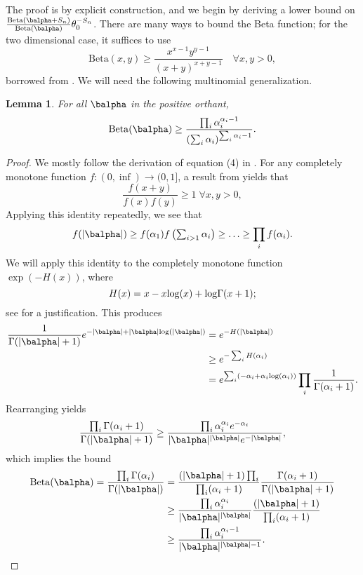 \documentclass[11pt]{article}
\def\log{{\rm log}}
\newcommand{\Beta}{\mathrm{Beta}}
\newtheorem{lemma}{Lemma}[section]
\begin{document}
The proof is by explicit construction, and we begin by deriving a lower bound on 
$
 \frac{\Beta(\balpha + S_n)} {\Beta(\balpha)} \theta_0 ^{-S_n}
$.
There are many ways to bound the Beta function; for the two dimensional case, it suffices to use
\begin{equation}\label{eq:Beta.lower.bound}
  \Beta(x,y) \geq \frac{x^{x-1}y^{y-1}}
  {(x+y)^{x+y-1}}\quad\forall x,y>0,
\end{equation}
borrowed from \cite{grenie2015inequalities}. We will need the following multinomial generalization.
\begin{lemma}\label{lem:beta.lower.bound}
  For all $\balpha$ in the positive orthant,
  \begin{equation*}
    \Beta(\balpha) \geq
    \frac{ \prod_i \alpha_i^{\alpha_i-1}}
    {(\sum_i \alpha_i)^{\sum_i \alpha_i-1}}.
  \end{equation*}
\end{lemma}
\begin{proof}
  We mostly follow the derivation of equation (4) in \cite{grenie2015inequalities}. For any completely monotone function $f:(0,\inf)\rightarrow(0,1]$, a result from \cite{kimberling1974probabilistic} yields that
\[
  \frac{f(x+y)}{f(x)f(y)} \geq 1 \; \forall x,y>0,
\]
Applying this identity repeatedly, we see that
\[
  f(|\balpha|)
  \geq
  f(\alpha_1)f\left(\textstyle \sum_{i>1} \alpha_i\right)
  \geq \ldots\geq
  \prod_i f(\alpha_i).
\]
We will apply this identity to the completely monotone function $\exp(-H(x))$, where
\[
  H(x) = x - x\log(x) + \log\Gamma(x+1);
\]
see \cite{grenie2015inequalities} for a justification. This produces
\begin{align*}
  \frac{1}{\Gamma(|\balpha|+1)}e^{-|\balpha|+|\balpha|\log(|\balpha|)}
  &=
  e^{-H\left(|\balpha|\right)}\\
  &\geq
    e^{-\sum_i H\left(\alpha_i\right)}\\
  &=
     e^{\sum_i\left(- \alpha_i + \alpha_i \log(\alpha_i)\right)}\prod_i\frac{1}{\Gamma(\alpha_i+1)}.
\end{align*}
Rearranging yields
\[
  \frac{\prod_i\Gamma(\alpha_i+1)}{\Gamma(|\balpha|+1)}
  \geq
  \frac{\prod_i \alpha_i^{\alpha_i}e^{-\alpha_i}}
  {|\balpha|^{|\balpha|}e^{-|\balpha|}},
\]
which implies the bound
\begin{align*}
  \Beta(\balpha)
  =
  \frac{\prod_i\Gamma(\alpha_i)}{\Gamma(|\balpha|)}
  &=
  \frac{(|\balpha|+1)\prod_i}
  {\prod_i (\alpha_i+1)}
   \frac{\Gamma(\alpha_i+1)}{\Gamma(|\balpha|+1)}\\
  &\geq
  \frac{\prod_i \alpha_i^{\alpha_i}}
  {|\balpha|^{|\balpha|}}
  \frac{(|\balpha|+1)}{\prod_i (\alpha_i+1)}\\
  &\geq
  \frac{\prod_i \alpha_i^{\alpha_i-1}}
  {|\balpha|^{|\balpha|-1}}.
\end{align*}
\end{proof}
\end{document}
